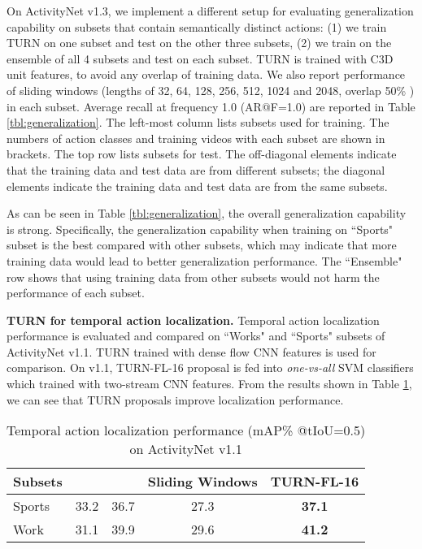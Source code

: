 \documentclass[10pt,twocolumn,letterpaper]{article}
\begin{document}
On ActivityNet v1.3, we implement a different setup for evaluating generalization capability on subsets that contain semantically distinct actions: (1) we train TURN on one subset and test on the other three subsets, (2) we train on the ensemble of all 4 subsets and test on each subset. TURN is trained with C3D unit features, to avoid any overlap of training data. We also report performance of sliding windows (lengths of 32, 64, 128, 256, 512, 1024 and 2048, overlap 50\% ) in each subset. Average recall at frequency 1.0 (AR@F=1.0) are reported in Table \ref{tbl:generalization}. The left-most column lists subsets used for training. The numbers of action classes and training videos with each subset are shown in brackets. The top row lists subsets for test. The off-diagonal elements indicate that the training data and test data are from different subsets; the diagonal elements indicate the training data and test data are from the same subsets.

As can be seen in Table \ref{tbl:generalization}, the overall generalization capability is strong. Specifically, the generalization capability when training on ``Sports" subset is the best compared with other subsets, which may indicate that more training data would lead to better generalization performance. The ``Ensemble" row shows that using training data from other subsets would not harm the performance of each subset. 








\textbf{TURN for temporal action localization.}
Temporal action localization performance is evaluated and compared on ``Works" and ``Sports" subsets of ActivityNet v1.1. TURN trained with dense flow CNN features is used for comparison. On v1.1, TURN-FL-16 proposal is fed into \textit{one-vs-all} SVM classifiers which trained with two-stream CNN features. From the results shown in Table \ref{tbl: tal of anet}, we can see that TURN proposals improve localization performance.

\begin{table}[h]\small
\centering
\caption{Temporal action localization performance (mAP\% @tIoU=0.5) on ActivityNet v1.1}
\label{tbl: tal of anet}
\begin{tabular}{l|cccc}
\hline
Subsets & {\cite{caba2015activitynet}} & {\cite{Yeung_2016_CVPR}} & Sliding Windows & TURN-FL-16 \\ \hline
Sports  & 33.2   & 36.7   & 27.3    & \textbf{37.1}           \\ \hline
Work    & 31.1   & 39.9   & 29.6      &   \textbf{41.2}             \\ \hline
\end{tabular}
\end{table}
\end{document}
